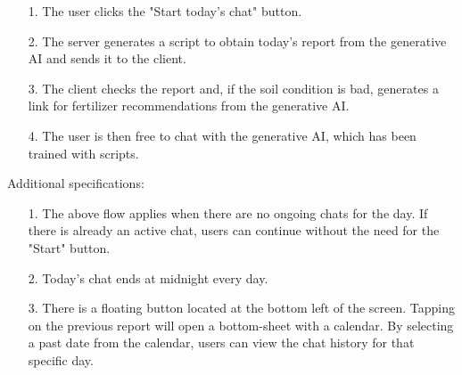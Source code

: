 \documentclass[conference, a4paper]{IEEEtran}
\begin{document}
\begin{enumerate}
    \item[1.]The user clicks the "Start today's chat" button.
    \item[2.]The server generates a script to obtain today's report from the generative AI and sends it to the client.
    \item[3.]The client checks the report and, if the soil condition is bad, generates a link for fertilizer recommendations from the generative AI.
    \item[4.]The user is then free to chat with the generative AI, which has been trained with scripts.
\end{enumerate}

\noindent Additional specifications:

\begin{enumerate}
    \item[1.]The above flow applies when there are no ongoing chats for the day. If there is already an active chat, users can continue without the need for the "Start" button.
    \item[2.]Today's chat ends at midnight every day.
    \item[3.]There is a floating button located at the bottom left of the screen. Tapping on the previous report will open a bottom-sheet with a calendar. By selecting a past date from the calendar, users can view the chat history for that specific day.
\end{enumerate}


\end{document}
